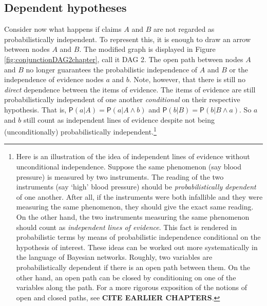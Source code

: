\documentclass[
  10pt,
  dvipsnames,enabledeprecatedfontcommands]{scrartcl}
\newcommand{\pr}[1]{\ensuremath{\mathsf{P}(#1)}}
\begin{document}
\hypertarget{dependent-hypotheses}{%
\subsection{Dependent hypotheses}\label{dependent-hypotheses}}

Consider now what happens if claims \(A\) and \(B\) are not regarded as
probabilistically independent. To represent this, it is enough to draw
an arrow between nodes \(A\) and \(B\). The modified graph is displayed
in Figure \ref{fig:conjunctionDAG2chapter}, call it \textsf{DAG 2}. The
open path between nodes \(A\) and \(B\) no longer guarantees the
probabilistic independence of \(A\) and \(B\) or the independence of
evidence nodes \(a\) and \(b\). Note, however, that there is still no
\emph{direct} dependence between the items of evidence. The items of
evidence are still probabilistically independent of one another
\textit{conditional} on their respective hypothesis. That is,
\(\pr{a \vert A}=\pr{a \vert A \wedge b}\) and
\(\pr{b \vert B}=\pr{b \vert B \wedge a}\). So \(a\) and \(b\) still
count as independent lines of evidence despite not being
(unconditionally) probabilistically independent.\footnote{Here is an
  illustration of the idea of independent lines of evidence without
  unconditional independence. Suppose the same phenomenon (say blood
  pressure) is measured by two instruments. The reading of the two
  instruments (say `high' blood pressure) should be
  \textit{probabilistically dependent} of one another. After all, if the
  instruments were both infallible and they were measuring the same
  phenomenon, they should give the exact same reading. On the other
  hand, the two instruments measuring the same phenomenon should count
  as \textit{independent lines of evidence}. This fact is rendered in
  probabilistic terms by means of probabilistic independence conditional
  on the hypothesis of interest. These ideas can be worked out more
  systematically in the language of Bayesian networks. Roughly, two
  variables are probabilistically dependent if there is an open path
  between them. On the other hand, an open path can be closed by
  conditioning on one of the variables along the path. For a more
  rigorous exposition of the notions of open and closed paths, see
  \textbf{CITE EARLIER CHAPTERS}.}
\end{document}
